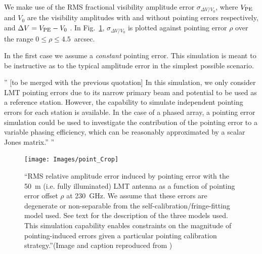 We make use of the RMS fractional visibility amplitude error $\sigma_{\Delta V/V_0}$, where $V_{\rm PE}$ and $V_{0}$ are the visibility amplitudes with and without pointing errors respectively, and  $\Delta V = V_{\rm PE} - V_{0}$ . In Fig.~\ref{fig:pointing}, $\sigma_{\Delta V/V_0}$ is plotted against pointing error $\rho$ over the range $0 \le \rho \le 4.5$~arcsec.

In the first case we assume a \emph{constant} pointing error. This simulation is meant to be instructive as to the typical amplitude error in the simplest possible scenario.

''
[to be merged with the previous quotation]
In this simulation, we only consider LMT pointing errors due to its narrow primary beam and potential to be used as a reference station. However, the capability to simulate independent pointing errors for each station is available. In the case of a phased array, a pointing error simulation could be used to investigate the contribution of the pointing error to a variable phasing efficiency, which can be reasonably approximated by a scalar Jones matrix.''
''
\begin{figure}[h!]
\texttt{[image: Images/point\_Crop]}
\caption{``RMS relative amplitude error induced by pointing error with the 50~m (i.e. fully illuminated) LMT antenna as a function of pointing error offset $\rho$ at 230~GHz. We assume that these errors are degenerate or non-separable from the self-calibration/fringe-fitting model used. See text for the description of the three models used. This simulation capability enables constraints on the magnitude of pointing-induced errors given a particular pointing calibration strategy.''(Image and caption reproduced from \citet{Blecher_2016})\label{fig:pointing}%
}
\end{figure}

